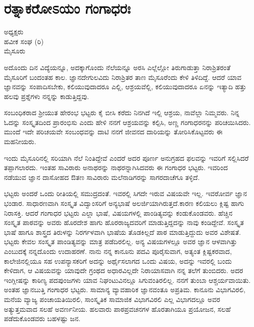 {\fontsize{14}{16}\selectfont
\chapter{ರತ್ನಾಕರೋಽಯಂ ಗಂಗಾಧರಃ}

\begin{center}
\smallskip

ಅಧ್ಯಕ್ಷರು\\
ಹವೀಕ ಸಂಘ (ರಿ)\\ 
ಮೈಸೂರು
\addrule
\end{center}

ಅದೊಂದು ದಿನ ವಿದ್ಯೆಯನ್ನೂ, ಅದಕ್ಕಾಗೊಂದು ನೆಲೆಯನ್ನೂ ಅರಸಿ ಎಲ್ಲೆಲ್ಲೋ ತಿರುಗಾಡುತ್ತಾ ನಿರಾಶ್ರಿತರಂತೆ ಮೈಸೂರಿಗೆ ಬಂದಂತಹ ಕಾಲ. ಜ್ಞಾನದೇಗುಲವಿದು ನಿರಾಶ್ರಿತರ ತಾಣ ಮೈಸೂರೆಂದು ಕೇಳಿ ತಿಳಿದಿದ್ದೆ. ಆದರೆ ಯಾವ ಜ್ಞಾನವನ್ನು ಸಂಪಾದಿಸಬೇಕು, ಕಲಿಯುವುದಾದರೂ ಎಲ್ಲಿ, ಆಶ್ರಯವೆಲ್ಲಿ, ಕಲಿಯುವುದಾದರೂ ಏನನ್ನು  ಇತ್ಯಾದಿ ಹತ್ತು ಹಲವು ಪ್ರಶ್ನೆಗಳು ನನ್ನನ್ನು ಕಾಡುತ್ತಿದ್ದವು.

ಸಂಬಂಧಿಕರಾದ ಶ್ರೀಯುತ ಹೇರಂಭ ಭಟ್ಟರು ಕೈ ಬೀಸಿ ಕರೆದು ನಿನಗಿದೆ ಇಲ್ಲಿ ಆಶ್ರಯ, ನಾವೆಲ್ಲಾ ನಿಮ್ಮವರು. ನಿನ್ನ ಓದನ್ನು ಸಂಸ್ಕೃತದಿಂದ ಪ್ರಾರಂಭಿಸು ಎಂದು ಹೇಳಿ ನನಗೆ ಆಶ್ರಯವನ್ನು ಕಲ್ಪಿಸಿ, ಅಣ್ಣ ಗಂಗಾಧರನನ್ನು ಪರಿಚಯಿಸಿದರು. ಮುಂದೆ ಇದೇ ಪರಿಚಯವೇ ಸಂಬಂಧವನ್ನು ದಾಟಿ ನನಗೆ ಜೀವನದ ದಾರಿಯನ್ನು ತೋರಿಸಿ\-ಕೊಟ್ಟವರು ಈ ಮಹನೀಯರು.

ಇಂದು ಮೈಸೂರಿನಲ್ಲಿ ಸರಿಯಾಗಿ ನೆಲೆ ನಿಂತಿದ್ದೇವೆ ಎಂದರೆ ಅದರ ಪೂರ್ಣ ಅನುಗ್ರಹದ ಫಲವನ್ನು ಇವರಿಗೆ ಸಲ್ಲಿಸಿದರೆ ತಪ್ಪಾಗಲಾರದು. ಇಂತಹ ಸಾವಿರಾರು ಅನಾಥರನ್ನು ನಾಥರನ್ನಾಗಿಸಿದವರು ಈ ಗಂಗಾಧರ ಭಟ್ಟರು. ಇವರಿಂದ ನಡೆಯುವ ಜ್ಞಾನ ದಾಸೋಹದ ಔತಣ ಸಾವಿರಾರು ಮಲೆನಾಡಿಗರನ್ನು ಸಾಗರದಾಚೆಗೂ ತಳ್ಳಿದೆ.

ಭಟ್ಟರು ಅಂದರೆ ಒಂದು ರೀತಿಯಲ್ಲಿ ಸಮುದ್ರದಂತೆ. ಇವರಲ್ಲಿ ಸಿಗದೇ ಇರುವ ವಿಷಯವೇ ಇಲ್ಲ. ಇವರೋರ್ವ ಜ್ಞಾನ ಭಂಡಾರ. ಸಾಧಾರಣವಾಗಿ ಸಂಸ್ಕೃತ ವಿದ್ವಾಂಸರಿಗೆ ಅನ್ಯಭಾಷೆ ಅಲರ್ಜಿಯಾಗಿರುತ್ತದೆ.ಕಾರಣ ಕಲಿಯಲು ಕ್ಲಿಷ್ಟ ಹಾಗು ನಿರಾಸಕ್ತಿ. ಆದರೆ ಗಂಗಾಧರ ಭಟ್ಟರು ಎಲ್ಲಾ ಭಾಷೆ, ವಿಷಯಗಳಲ್ಲಿ ಪಾಂಡಿತ್ಯವನ್ನು ಕಂಡು\-ಕೊಂಡವರು. ಹೆಚ್ಚಿನ ಸಂಸ್ಕೃತ ಪಾಠವನ್ನು ಅವರು ಹೊರದೇಶ ಹಾಗು ಹೊರರಾಜ್ಯದವರಿಗೆ ಮಾಡುತ್ತಿದ್ದದನ್ನು ನಾವು ಕಂಡಿದ್ದೇವೆ. ಸಂಸ್ಕೃತ ಭಾಷೆ ಹಾಗೂ ಶಾಸ್ತ್ರದ ತಿರುಳನ್ನು ನಿರರ್ಗಳ\-ವಾಗಿ ಭಾಷೆಯ ತೊಡಕಿಲ್ಲದೆ ಪಾಠ ಮಾಡುತ್ತಿದ್ದುದು ಅವರ ವಿಶೇಷತೆ. ಭಟ್ಟರು ಕೇವಲ ಸಂಸ್ಕೃತ ಪಾಂಡಿತ್ಯವನ್ನು ಮಾತ್ರ ಪಡೆದಿರಲಿಲ್ಲ. ಅನ್ಯ ವಿಷಯಗಳಲ್ಲೂ ಅವರ ಜ್ಞಾನ ಆಳವಾಗಿತ್ತು ಎಂಬುದಕ್ಕೆ ನನ್ನದೊಂದು ಉದಾಹರಣೆ. ನಾನು ನನ್ನ ಕಾನೂನು ಪದವಿ ಪೂರೈಸುವಾಗ, ಅತ್ಯಂತ ಕ್ಲಿಷ್ಟಕರವಾದ, ಕಾಲೇಜಿನಲ್ಲಿಯೂ ಸಹ ಉಪನ್ಯಾಸಕರಿಗೆ ಅದನ್ನು ಅರ್ಥೈಸಲಾಗದ ಒಂದು ವಿಷಯ, ಅದನ್ನು ಇವರಲ್ಲಿ ಬಂದು ಕೇಳಿದಾಗ, ಆ ವಿಷಯವನ್ನು ಯಾವುದೇ ಗ್ರಂಥದ ಅಧಾರವಿಲ್ಲದೇ ನಿರಾಯಾಸವಾಗಿ ನನ್ನ ತಲೆಗೆ ತುಂಬಿದರು. ಅದರ ಇಂಗ್ಲೀಷನ್ನು ಕಾಠಿಣ್ಯ ಪದಪುಂಜಗಳು ಯಾವ ನಿಘಂಟುವಿನಲ್ಲೂ ಸಿಗುವಂತಿರಲಿಲ್ಲ. ನನಗೆ ತುಂಬಾ ಆಶ್ಚರ್ಯವಾಯಿತು. ಅಂತಹ ಜ್ಞಾನಬುತ್ತಿ ಗಂಗಾಧರ ಭಟ್ಟರು. ಸಾಮಾನ್ಯ ವ್ಯಾವಹಾರಿಕ ಜ್ಞಾನವಂತೂ ಅಪ್ರತಿಮ. ಕಾನೂನು ವಿಭಾಗವಿರಲಿ, ಮನೆಯ ವ್ಯಾಜ್ಯ ಪಂಚಾಯತಿಯಿರಲಿ, ಸಾಂಸ್ಕೃತಿಕ ಸಾಮಾಜಿಕ ವಿಭಾಗವಿರಲಿ ಎಲ್ಲ ವಿಭಾಗದಲ್ಲೂ ಅವರ ಅತ್ಯುತ್ತಮವಾದ ಸಲಹೆ ಅವರ್ಣನೀಯ. ಹಲವಾರು ಪಾಠಪ್ರವಚನಗಳ ಹೊರತಾಗಿಯೂ ಪ್ರಯೋಜನ, ಸಲಹೆ ಪಡೆದುಕೊಂಡವರು ಬಹಳಷ್ಟು ಜನ.

}
